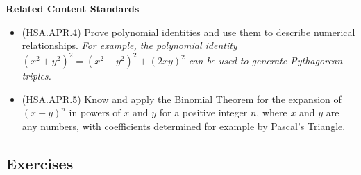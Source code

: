 \documentclass[
]{book}
\providecommand{\tightlist}{%
  \setlength{\itemsep}{0pt}\setlength{\parskip}{0pt}}
\newenvironment{standards}{}{}
\theoremstyle{definition}
\theoremstyle{definition}
\theoremstyle{definition}
\theoremstyle{definition}
\theoremstyle{remark}
\begin{document}
\begin{standards}

\begin{center}
\textbf{Related Content Standards}

\end{center}

\begin{itemize}
\tightlist
\item
  (HSA.APR.4) Prove polynomial identities and use them to describe numerical relationships. \textit{For example, the polynomial identity $(x^2 + y^2)^2 = (x^2 - y^2)^2 + (2xy)^2$ can be used to generate Pythagorean triples.}
\item
  (HSA.APR.5) Know and apply the Binomial Theorem for the expansion of \((x + y)^n\) in powers of \(x\) and \(y\) for a positive integer \(n\), where \(x\) and \(y\) are any numbers, with coefficients determined for example by Pascal's Triangle.\\
\end{itemize}

\end{standards}

\hypertarget{exercises-33}{%
\subsection{Exercises}\label{exercises-33}}
\end{document}
